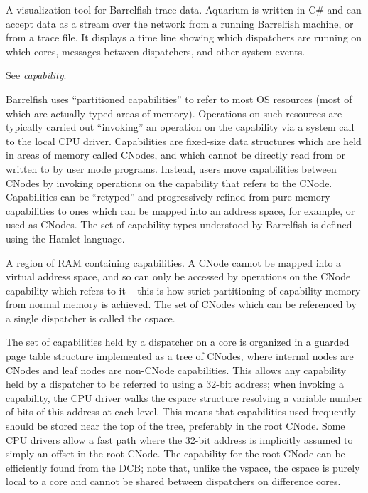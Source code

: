 \item[Aquarium:] A visualization tool for Barrelfish trace data. Aquarium is written in C\# and can accept data as a stream over the network from a running Barrelfish machine, or from a trace file.  It displays a time line showing which dispatchers are running on which cores, messages between dispatchers, and other system events.

\item[cap:] See \textit{capability}.

\item[capability \textrm{\textit{(cap)}}:] Barrelfish uses ``partitioned capabilities'' to refer to most OS resources (most of which are actually typed areas of memory).  Operations on such resources are typically carried out ``invoking'' an operation on the capability via a system call to the local CPU driver.  Capabilities are fixed-size data structures which are held in areas of memory called CNodes, and which cannot be directly read from or written to by user mode programs.  Instead, users move capabilities between CNodes by invoking operations on the capability that refers to the CNode.  Capabilities can be ``retyped'' and progressively refined from pure memory capabilities to ones which can be mapped into an address space, for example, or used as CNodes.  The set of capability types understood by Barrelfish is defined using the Hamlet language.

\item[capability node \textrm{\textit{(cnode)}}:] A region of RAM containing capabilities.  A CNode cannot be mapped into a virtual address space, and so can only be accessed by operations on the CNode capability which refers to it -- this is how strict partitioning of capability memory from normal memory is achieved.  The set of CNodes which can be referenced by a single dispatcher is called the cspace.

\item[capability space \textrm{\textit{(cspace)}}:] The set of capabilities held by a dispatcher on a core is organized in a guarded page table structure implemented as a tree of CNodes, where internal nodes are CNodes and leaf nodes are non-CNode capabilities.  This allows any capability held by a dispatcher to be referred to using a 32-bit address; when invoking a capability, the CPU driver walks the cspace structure resolving a variable number of bits of this address at each level. This means that capabilities used frequently should be stored near the top of the tree, preferably in the root CNode.  Some CPU drivers allow a fast path where the 32-bit address is implicitly assumed to simply an offset in the root CNode.  The capability for the root CNode can be efficiently found from the DCB; note that, unlike the vspace, the cspace is purely local to a core and cannot be shared between dispatchers on difference cores.

